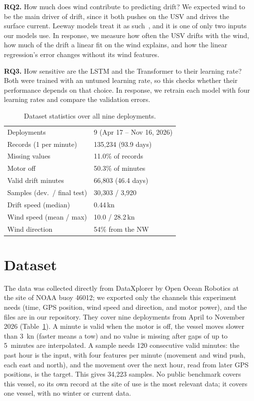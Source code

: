\documentclass[sigconf]{acmart}
\begin{document}
\noindent\textbf{RQ2.} How much does wind contribute to predicting drift? We expected wind to be the main driver of drift, since it both pushes on the USV and drives the surface current.
Leeway models treat it as such~\cite{breivik2011leeway}, and it is one of only two inputs our models use. In response, we measure how often the USV drifts with the wind, how much of the drift a linear fit on the wind explains, and how the linear regression's error changes without its wind features.


\noindent\textbf{RQ3.} How sensitive are the LSTM and the Transformer to their learning rate? Both were trained with an untuned learning rate, so this checks whether their performance depends on that choice. In response, we retrain each model with four learning rates and compare the validation errors.


\begin{table}[t]
\centering\footnotesize
\caption{Dataset statistics over all nine deployments.}
\label{tab:dataset}
\begin{tabular}{@{}ll@{}}
\toprule
Deployments            & 9 (Apr 17 -- Nov 16, 2026) \\
Records (1 per minute) & 135{,}234 (93.9 days) \\
Missing values         & 11.0\% of records \\
Motor off              & 50.3\% of minutes \\
Valid drift minutes    & 66{,}803 (46.4 days) \\
Samples (dev.\ / final test) & 30{,}303 / 3{,}920 \\
Drift speed (median)   & 0.44\,kn \\
Wind speed (mean / max)& 10.0 / 28.2\,kn \\
Wind direction         & 54\% from the NW \\
\bottomrule
\end{tabular}
\end{table}

\section{Dataset}
The data was collected directly from DataXplorer by Open Ocean Robotics at the site of NOAA buoy 46012; we exported only the channels this experiment needs (time, GPS position, wind speed and direction, and motor power), and the files are in our repository. They cover nine deployments from April to November 2026 (Table~\ref{tab:dataset}). A minute is valid when the motor is off, the vessel moves slower than 3~kn (faster means a tow) and no value is missing after gaps of up to 5~minutes are interpolated. A sample needs 120 consecutive valid minutes: the past hour is the input, with four features per minute (movement and wind push, each east and north), and the movement over the next hour, read from later GPS positions, is the target. This gives 34{,}223 samples. No public benchmark covers this vessel, so its own record at the site of use is the most relevant data; it covers one vessel, with no winter or current data.
\end{document}
